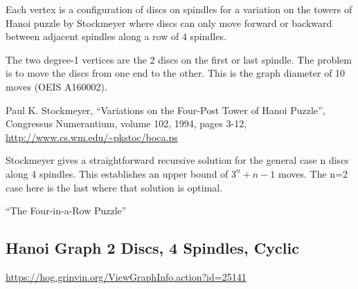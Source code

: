 \documentclass{article}
\begin{document}
Each vertex is a configuration of discs on spindles for a variation on the towers of Hanoi puzzle by Stockmeyer where discs can only move forward or backward between adjacent spindles along a row of 4 spindles.

The two degree-1 vertices are the 2 discs on the first or last
spindle.  The problem is to move the discs from one end to the other.
This is the graph diameter of 10 moves (OEIS A160002).

Paul K. Stockmeyer, ``Variations on the Four-Post Tower of Hanoi
Puzzle'', Congressus Numerantium, volume 102, 1994, pages 3-12,
\url{http://www.cs.wm.edu/~pkstoc/boca.ps}



Stockmeyer gives a straightforward recursive solution for the general case n discs along 4 spindles.  This establishes an upper bound of $3^n+n-1$ moves.  The n=2 case here is the last where that solution is optimal.

``The Four-in-a-Row Puzzle''


\subsection{Hanoi Graph 2 Discs, 4 Spindles, Cyclic}

\url{https://hog.grinvin.org/ViewGraphInfo.action?id=25141}

\begin{center}
\end{center}
\end{document}
